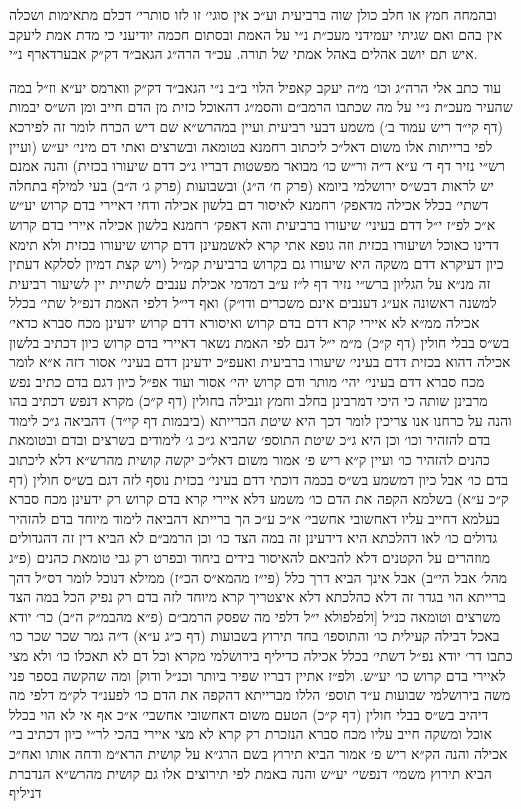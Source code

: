\documentclass[12pt, openany]{book}
\begin{document}
\begin{multicols}{2}
ובהמחה חמץ או חלב כולן שוה ברביעית וע״כ אין סוגי׳ זו לזו סותרי׳ דכלם מתאימות ושכלה אין בהם ואם שגיתי יעמידני מעכ״ת נ״י על האמת ובסתום חכמה יודיעני כי מדת אמת ליעקב איש תם יושב אהלים באהל אמתי של תורה. עכ״ד הרה״ג הגאב״ד דק״ק אבערדארף נ״י.\\\vspace{0pt}

עוד כתב אלי הרה״ג וכו׳ מ״ה יעקב קאפיל הלוי ב״ב נ״י הגאב״ד דק״ק ווארמס יע״א וז״ל במה שהעיר מעכ״ת נ״י על מה שכתבו הרמב״ם והסמ״ג דהאוכל כזית מן הדם חייב ומן הש״ס יבמות (דף קי״ד ריש עמוד ב׳) משמע דבעי רביעית ועיין במהרש״א שם דיש הכרח לומר זה לפירכא לפי ברייתות אלו משום דאל״כ ליכתוב רחמנא בטומאה ובשרצים ואתי דם מיני׳ יע״ש (ועיין רש״י נזיר דף ד׳ ע״א ד״ה ור״ש כו׳ מבואר מפשטות דבריו ג״כ דדם שיעורו בכזית) והנה אמנם יש לראות דבש״ס ירושלמי ביומא (פרק ח׳ ה״ג) ובשבועות (פרק ג׳ ה״ב) בעי למילף בתחלה דשתי׳ בכלל אכילה מדאפק׳ רחמנא לאיסור דם בלשון אכילה ודחי דאיירי בדם קרוש יע״ש א״כ לפ״ז י״ל דדם בעיני׳ שיעורו ברביעית והא דאפק׳ רחמנא בלשון אכילה איירי בדם קרוש דדינו כאוכל ושיעורו בכזית וזה גופא אתי קרא לאשמעינן דדם קרוש שיעורו בכזית ולא תימא כיון דעיקרא דדם משקה היא שיעורו גם בקרוש ברביעית קמ״ל (ויש קצת דמיון לסלקא דעתין זה מנ״א על הגליון ברש״י נזיר דף ל״ז ע״ב דמדמי אכילת ענבים לשתיית יין לשיעור רביעית למשנה ראשונה אע״ג דענבים אינם משכרים ודו״ק) ואף די״ל דלפי האמת דנפ״ל שתי׳ בכלל אכילה ממ״א לא איירי קרא דדם בדם קרוש ואיסורא דדם קרוש ידעינן מכח סברא כדאי׳ בש״ס בבלי חולין (דף ק״כ) מ״מ י״ל דגם לפי האמת נשאר דאיירי בדם קרוש כיון דכתיב בלשון אכילה דהוא בכזית דדם בעיני׳ שיעורו ברביעית ואעפ״כ ידעינן דדם בעיני׳ אסור דזה א״א לומר מכח סברא דדם בעיני׳ יהי׳ מותר ודם קרוש יהי׳ אסור ועוד אפ״ל כיון דגם בדם כתיב נפש מרבינן שותה כי היכי דמרבינן בחלב וחמץ ונבילה בחולין (דף ק״כ) מקרא דנפש דכתיב בהו והנה על כרחנו אנו צריכין לומר דכך היא שיטת הברייתא (ביבמות דף קי״ד) דהביאה ג״כ לימוד בדם להזהיר וכו׳ וכן היא ג״כ שיטת התוספ׳ שהביא ג״כ ג׳ לימודים בשרצים ובדם ובטומאת כהנים להזהיר כו׳ ועיין ק״א ריש פ׳ אמור משום דאל״כ יקשה קושית מהרש״א דלא ליכתוב בדם כו׳ אבל כיון דמשמע בש״ס בכמה דוכתי דדם בעיני׳ בכזית נוסף לזה דגם בש״ס חולין (דף ק״כ ע״א) בשלמא הקפה את הדם כו׳ משמע דלא איירי קרא בדם קרוש רק ידעינן מכח סברא בעלמא דחייב עליו דאחשובי אחשבי׳ א״כ ע״כ הך ברייתא דהביאה לימוד מיוחד בדם להזהיר גדולים כו׳ לאו דהלכתא היא דידעינן זה במה הצד כו׳ וכן הרמב״ם לא הביא דין זה דהגדולים מוזהרים על הקטנים דלא להביאם להאיסור בידים ביחוד ובפרט רק גבי טומאת כהנים (פ״ג מהל׳ אבל הי״ב) אבל אינך הביא דרך כלל (פי״ז מהמא״ס הכ״ז) ממילא דנוכל לומר דס״ל דהך ברייתא הוי בגדר זה דלא כהלכתא דלא איצטריך קרא מיוחד לזה בדם רק נפיק הכל במה הצד משרצים וטומאה כנ״ל [ולפלפולא י״ל דלפי מה שפסק הרמב״ם (פ״א מהבמ״ק ה״ב) כר׳ יודא באכל דבילה קעילית כו׳ והתוספו׳ בחד תירוץ בשבועות (דף כ״ג ע״א) ד״ה גמר שכר שכר כו׳ כתבו דר׳ יודא נפ״ל דשתי׳ בכלל אכילה כדיליף בירושלמי מקרא וכל דם לא תאכלו כו׳ ולא מצי לאיירי בדם קרוש כו׳ יע״ש. ולפ״ז אתיין דבריו שפיר ביותר וכנ״ל ודוק] ומה שהקשה בספר פני משה בירושלמי שבועות ע״ד תוספ׳ הללו מברייתא דהקפה את הדם כו׳ לפענ״ד לק״מ דלפי מה דיהיב בש״ס בבלי חולין (דף ק״כ) הטעם משום דאחשובי אחשבי׳ א״כ אף אי לא הוי בכלל אוכל ומשקה חייב עליו מכח סברא הנזכרת רק קרא לא מצי איירי בהכי לר״י כיון דכתיב בי׳ אכילה והנה הק״א ריש פ׳ אמור הביא תירוץ בשם הרג״א על קושית הרא״מ ודחה אותו ואח״כ הביא תירוץ משמי׳ דנפשי׳ יע״ש והנה באמת לפי תירוצים אלו גם קושית מהרש״א הנדברת דניליף 
\end{multicols}
\end{document}
